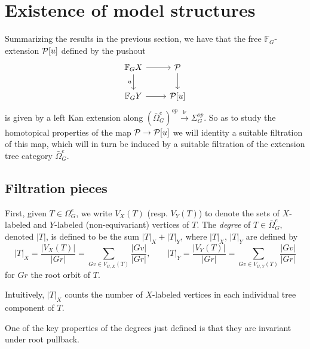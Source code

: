 \documentclass[a4paper,10pt]{article}%
\begin{document}
\newpage



\section{Existence of model structures}
\label{MODEL_STRUCTURES_SECTION}

Summarizing the results in the previous section, we have that the free $\mathbb F_G$-extension $\P[u]$ defined by the pushout
\begin{equation}\label{CELLEXTPUSH EQ}
\begin{tikzcd}
  \mathbb F_G X \arrow[d, "u"'] \arrow[r] & \P \arrow[d]\\
  \mathbb F_G Y \arrow[r] & \P[u]
\end{tikzcd}
\end{equation}
is given by a left Kan extension along 
$(\bar{\Omega}_{G}^e)^{op} \xrightarrow{\mathsf{lr}} \Sigma_G^{op}$. So as to study the homotopical properties of the map $\P \to \P[u]$ we will identity a suitable filtration of this map, which will in turn be induced by a suitable filtration of the extension tree category $\bar{\Omega}_{G}^e$.


\subsection{Filtration pieces}
\label{FILTRATION_SECTION}
First, given $T\in \Omega_G^e$, we write $V_X(T)$ (resp. $V_Y(T)$) to denote the sets of $X$-labeled and $Y$-labeled (non-equivariant) vertices of $T$.
The \textit{degree} of $T \in \bar{\Omega}_{G}^e$,
denoted $|T|$, is defined to be the sum $|T|_X + |T|_Y$, where $|T|_X$, $|T|_Y$ are defined by
\[
|T|_X = \dfrac{|V_X(T)|}{|G r|} = \sum\limits_{G v\in V_{G,X}(T)}\dfrac{|G v|}{|G r|},
\qquad
|T|_Y = \dfrac{|V_Y(T)|}{|G r|} = \sum\limits_{G v\in V_{G,Y}(T)}\dfrac{|G v|}{|G r|}
\]
for $G r$ the root orbit of $T$. 

Intuitively, $|T|_X$ counts the number of $X$-labeled vertices in each individual tree component of $T$.


\begin{remark}
	One of the key properties of the degrees just defined is that they are invariant under root pullback.
\end{remark}
\end{document}

